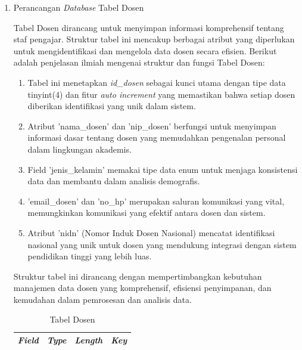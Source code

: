 \begin{enumerate}

	\item Perancangan \textit{Database} Tabel Dosen

	      Tabel Dosen dirancang untuk menyimpan informasi komprehensif tentang staf pengajar. Struktur tabel ini mencakup berbagai atribut yang diperlukan untuk mengidentifikasi dan mengelola data dosen secara efisien. Berikut adalah penjelasan ilmiah mengenai struktur dan fungsi Tabel Dosen:

	      \begin{enumerate}[label=\alph*.]
		      \item Tabel ini menetapkan \textit{id\_dosen} sebagai kunci utama dengan tipe data tinyint(4) dan fitur \textit{auto increment} yang memastikan bahwa setiap dosen diberikan identifikasi yang unik dalam sistem.
		      \item Atribut 'nama\_dosen' dan 'nip\_dosen' berfungsi untuk menyimpan informasi dasar tentang dosen yang memudahkan pengenalan personal dalam lingkungan akademis.
		      \item Field 'jenis\_kelamin' memakai tipe data enum untuk menjaga konsistensi data dan membantu dalam analisis demografis.
		      \item 'email\_dosen' dan 'no\_hp' merupakan saluran komunikasi yang vital, memungkinkan komunikasi yang efektif antara dosen dan sistem.
		      \item Atribut 'nidn' (Nomor Induk Dosen Nasional) mencatat identifikasi nasional yang unik untuk dosen yang mendukung integrasi dengan sistem pendidikan tinggi yang lebih luas.
	      \end{enumerate}

	      Struktur tabel ini dirancang dengan mempertimbangkan kebutuhan manajemen data dosen yang komprehensif, efisiensi penyimpanan, dan kemudahan dalam pemrosesan dan analisis data.

		      {
			      \selectfont
			      \begin{longtable}{l l l l}
				      \caption{Tabel Dosen}
				      \label{admin}                                                                                               \\
				      \hline
				      \textbf{\textit{Field}} & \textbf{\textit{Type}} & \textbf{\textit{Length}}   & \textbf{\textit{Key}}       \\
				      \hline
				      \endfirsthead


\end{longtable}}
\end{enumerate}
